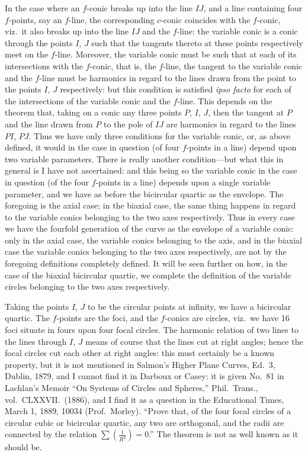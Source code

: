 \documentclass[11pt,a4paper]{article}
\begin{document}
In the case where an $f$-conic breaks up into the line $IJ$, and a line containing four $f$-points, say an $f$-line, the corresponding $c$-conic coincides with the $f$-conic, viz.\ it also breaks up into the line $IJ$ and the $f$-line: the variable conic is a conic through the points $I$, $J$ such that the tangents thereto at these points respectively meet on the $f$-line. Moreover, the variable conic must be such that at each of its intersections with the $f$-conic, that is, the $f$-line, the tangent to the variable conic and the $f$-line must be harmonics in regard to the lines drawn from the point to the points $I$, $J$ respectively: but this condition is satisfied \emph{ipso facto} for each of the intersections of the variable conic and the $f$-line. This depends on the theorem that, taking on a conic any three points $P$, $I$, $J$, then the tangent at $P$ and the line drawn from $P$ to the pole of $IJ$ are harmonics in regard to the lines $PI$, $PJ$. Thus we have only three conditions for the variable conic, or, as above defined, it would in the case in question (of four $f$-points in a line) depend upon two variable parameters. There is really another condition---but what this in general is I have not ascertained: and this being so the variable conic in the case in question (of the four $f$-points in a line) depends upon a single variable parameter, and we have as before the bicircular quartic as the envelope. The foregoing is the axial case; in the biaxial case, the same thing happens in regard to the variable conics belonging to the two axes respectively. Thus in every case we have the fourfold generation of the curve as the envelope of a variable conic: only in the axial case, the variable conics belonging to the axis, and in the biaxial case the variable conics belonging to the two axes respectively, are not by the foregoing definitions completely defined. It will be seen further on how, in the case of the biaxial bicircular quartic, we complete the definition of the variable circles belonging to the two axes respectively.

Taking the points $I$, $J$ to be the circular points at infinity, we have a bicircular quartic. The $f$-points are the foci, and the $f$-conics are circles, viz.\ we have 16 foci situate in fours upon four focal circles. The harmonic relation of two lines to the lines through $I$, $J$ means of course that the lines cut at right angles; hence the focal circles cut each other at right angles: this must certainly be a known property, but it is not mentioned in Salmon's Higher Plane Curves, Ed.\ 3, Dublin, 1879, and I cannot find it in Darboux or Casey: it is given No.\ 81 in Lachlan's Memoir ``On Systems of Circles and Spheres,'' Phil.\ Trans., vol.\ CLXXVII.\ (1886), and I find it as a question in the Educational Times, March 1, 1889, 10034 (Prof.\ Morley). ``Prove that, of the four focal circles of a circular cubic or bicircular quartic, any two are orthogonal, and the radii are connected by the relation $\sum(\frac{1}{R^2}) = 0$.'' The theorem is not as well known as it should be.
\end{document}
